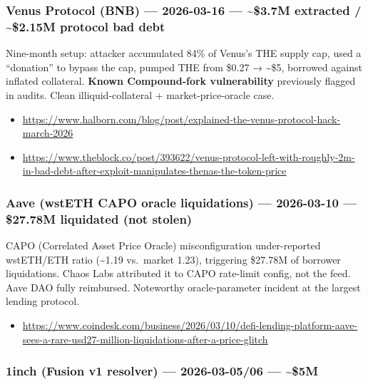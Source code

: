 \subsubsection{Venus Protocol (BNB) --- 2026-03-16 --- \textasciitilde\$3.7M extracted / \textasciitilde\$2.15M protocol bad debt}\label{venus-protocol-bnb-2026-03-16-3.7m-extracted-2.15m-protocol-bad-debt}

Nine-month setup: attacker accumulated 84\% of Venus's THE supply cap, used a ``donation'' to bypass the cap, pumped THE from \$0.27 → \textasciitilde\$5, borrowed against inflated collateral. \textbf{Known Compound-fork vulnerability} previously flagged in audits. Clean illiquid-collateral + market-price-oracle case.

\begin{itemize}
\tightlist
\item
  \url{https://www.halborn.com/blog/post/explained-the-venus-protocol-hack-march-2026}
\item
  \url{https://www.theblock.co/post/393622/venus-protocol-left-with-roughly-2m-in-bad-debt-after-exploit-manipulates-thenas-the-token-price}
\end{itemize}

\subsubsection{Aave (wstETH CAPO oracle liquidations) --- 2026-03-10 --- \$27.78M liquidated (not stolen)}\label{aave-wsteth-capo-oracle-liquidations-2026-03-10-27.78m-liquidated-not-stolen}

CAPO (Correlated Asset Price Oracle) misconfiguration under-reported wstETH/ETH ratio (\textasciitilde1.19 vs.~market 1.23), triggering \$27.78M of borrower liquidations. Chaos Labs attributed it to CAPO rate-limit config, not the feed. Aave DAO fully reimbursed. Noteworthy oracle-parameter incident at the largest lending protocol.

\begin{itemize}
\tightlist
\item
  \url{https://www.coindesk.com/business/2026/03/10/defi-lending-platform-aave-sees-a-rare-usd27-million-liquidations-after-a-price-glitch}
\end{itemize}

\subsubsection{1inch (Fusion v1 resolver) --- 2026-03-05/06 --- \textasciitilde\$5M}\label{inch-fusion-v1-resolver-2026-03-0506-5m}

